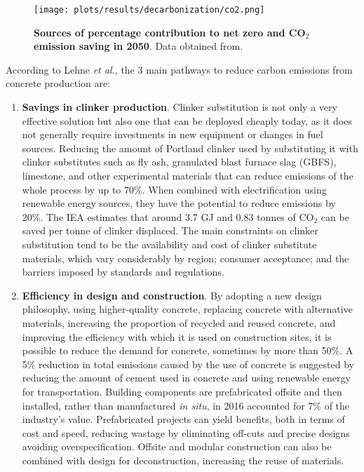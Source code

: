 \begin{figure}[ht!]
  \centering
  \texttt{[image: plots/results/decarbonization/co2.png]}
  \caption[Sources of percentage contribution to net zero and CO$_2$ emission saving in 2050]{\textbf{Sources of percentage contribution to net zero and CO$_2$ emission saving in 2050}. Data obtained from.\autocite{aus_2022}}
  \label{fig:co2}
\end{figure}

According to Lehne \textit{et al.},\autocite{lehne2018making} the 3 main pathways to reduce carbon emissions from concrete production are:

\begin{enumerate}
\item \textbf{Savings in clinker production}. Clinker substitution is not only a very effective solution but also one that can be deployed cheaply today, as it does not generally require investments in new equipment or changes in fuel sources.\autocite{lehne2018making} Reducing the amount of Portland clinker used by substituting it with clinker substitutes such as fly ash, granulated blast furnace slag (GBFS), limestone, and other experimental materials that can reduce emissions of the whole process by up to 70\%. When combined with electrification using renewable energy sources, they have the potential to reduce emissions by 20\%. The IEA estimates that around 3.7 GJ and 0.83 tonnes of CO$_2$ can be saved per tonne of clinker displaced.\autocite{iea2017energy} The main constraints on clinker substitution tend to be the availability and cost of clinker substitute materials, which vary considerably by region; consumer acceptance; and the barriers imposed by standards and regulations.\autocite{imbabi2012trends}
\item \textbf{Efficiency in design and construction}. By adopting a new design philosophy, using higher-quality concrete, replacing concrete with alternative materials, increasing the proportion of recycled and reused concrete, and improving the efficiency with which it is used on construction sites, it is possible to reduce the demand for concrete, sometimes by more than 50\%.\autocite{lehne2018making} A 5\% reduction in total emissions caused by the use of concrete is suggested by reducing the amount of cement used in concrete and using renewable energy for transportation.\autocite{aus_2022} Building components are prefabricated offsite and then installed, rather than manufactured \textit{in situ}, in 2016 accounted for 7\% of the industry’s value.\autocite{pickard2020phasing} Prefabricated projects can yield benefits, both in terms of cost and speed, reducing wastage by eliminating off-cuts and precise designs avoiding overspecification.\autocite{science2018off} Offsite and modular construction can also be combined with design for deconstruction, increasing the reuse of materials.\autocite{BRE_2015}

\end{enumerate}
